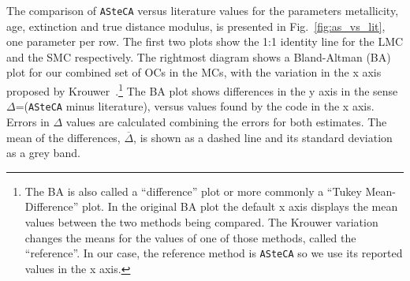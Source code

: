 \documentclass[a4paper,fleqn,usenatbib]{mnras}
\begin{document}
The comparison of \texttt{ASteCA} versus literature values for the parameters
metallicity, age, extinction and true distance modulus, is presented in
Fig.~\ref{fig:as_vs_lit}, one parameter per row. The first two plots show the
1:1 identity line for the LMC and the SMC respectively.
%
The rightmost diagram shows a Bland-Altman (BA) plot for our combined set of
OCs in the MCs, with the variation in the
x axis proposed by Krouwer~\citep{Bland_1986,Krouwer_2008}.\footnote{The BA is
also called a ``difference'' plot or more commonly a ``Tukey Mean-Difference''
plot. In the original BA plot the default x axis displays the mean values
between the two methods being compared. The Krouwer variation changes the means
for the values of one of those methods, called the ``reference''. In our case,
the reference method is \texttt{ASteCA} so we use its reported values in the x
axis.}
%
The BA plot shows differences in the y axis in the sense $\Delta$=(\texttt
{ASteCA} minus literature), versus values found by the code in the x axis. Errors
in $\Delta$ values are calculated combining the errors for both estimates. The
mean of the differences, $\overline{\Delta}$, is shown as a dashed line and its
standard deviation as a grey band.\\
\end{document}
